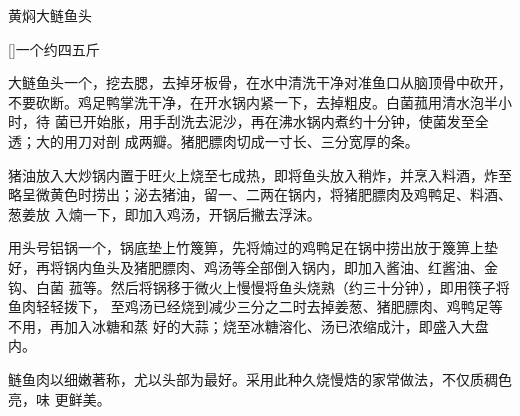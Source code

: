 \begin{recipe}{黄焖大鲢鱼头}

\ingredients

[\footnotemark]{一个约四五斤}

\preparation

\step 大鲢鱼头一个，挖去腮，去掉牙板骨，在水中清洗干净对准鱼口从脑顶骨中砍开，
不要砍断。鸡足鸭掌洗干净，在开水锅内紧一下，去掉粗皮。白菌菰用清水泡半小时，待
菌已开始胀，用手刮洗去泥沙，再在沸水锅内煮约十分钟，使菌发至全透；大的用刀对剖
成两瓣。猪肥膘肉切成一寸长、三分宽厚的条。

\step 猪油放入大炒锅内置于旺火上烧至七成热，即将鱼头放入稍炸，并烹入料酒，炸至
略呈微黄色时捞出；泌去猪油，留一、二两在锅内，将猪肥膘肉及鸡鸭足、料酒、葱姜放
入煵一下，即加入鸡汤，开锅后撇去浮沫。

\step 用头号铝锅一个，锅底垫上竹篾箅，先将煵过的鸡鸭足在锅中捞出放于篾箅上垫
好，再将锅内鱼头及猪肥膘肉、鸡汤等全部倒入锅内，即加入酱油、红酱油、金钩、白菌
菰等。然后将锅移于微火上慢慢将鱼头烧熟（约三十分钟），即用筷子将鱼肉轻轻拨下，
至鸡汤已经烧到减少三分之二时去掉姜葱、猪肥膘肉、鸡鸭足等不用，再加入冰糖和蒸
好的大蒜；烧至冰糖溶化、汤已浓缩成汁，即盛入大盘内。

\features

鲢鱼肉以细嫩著称，尤以头部为最好。采用此种久烧慢焅的家常做法，不仅质稠色亮，味
更鲜美。


\end{recipe}

